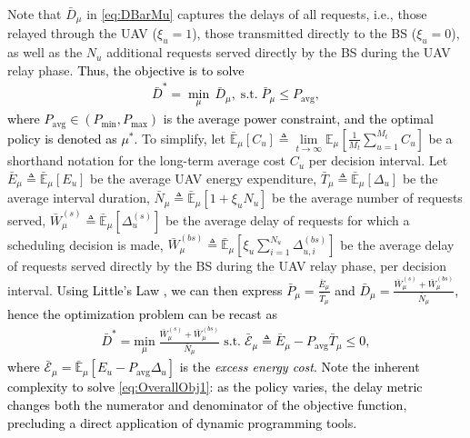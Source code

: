 \documentclass[10pt, twocolumn]{IEEEtran}
\theoremstyle{plain}
\theoremstyle{definition}
\theoremstyle{remark}
\newcommand\hlt[1]{\textcolor{black}{#1}}
\begin{document}
Note that $\bar{D}_{\mu}$ in \eqref{eq:DBarMu} captures the delays of all requests, i.e., those relayed through the UAV ($\xi_{u}{=}1$), those transmitted directly to the BS ($\xi_{u}{=}0$), as well as the $N_{u}$ additional requests served directly by the BS during the UAV relay phase. \hlt{Thus, the objective is to solve 
\begin{align}\label{eq:opt_prob_orig}
    \bar D^* = \min_{\mu} \, \bar{D}_{\mu}, \; \mathrm{s.t.} \; \bar P_{\mu} \leq P_{\mathrm{avg}},
\end{align}
where $P_{\mathrm{avg}}\in(P_{\min},P_{\max})$ is the average power constraint,
and the optimal policy is denoted as $\mu^*$.} To simplify, let $\bar{\mathbb{E}}_{\mu}[C_{u}]{\triangleq}\lim\limits_{t{\rightarrow}\infty}\mathbb{E}_{\mu}[\frac{1}{M_{t}}\sum_{u{=}1}^{M_{t}}C_{u}]$ be a shorthand notation for the long-term average cost $C_u$ per decision interval. Let $\bar{E}_{\mu}{\triangleq}\bar{\mathbb{E}}_{\mu}\left[E_{u}\right]$ be the average UAV energy expenditure, $\bar{T}_{\mu}{\triangleq}\bar{\mathbb{E}}_{\mu}\left[\Delta_{u}\right]$ be the average interval duration, $\bar{N}_{\mu}{\triangleq}\bar{\mathbb{E}}_{\mu}[1+\xi_{u}N_{u}]$ be the average number of requests served, $\bar{W}_{\mu}^{(s)}{\triangleq}\bar{\mathbb{E}}_{\mu}[\Delta_{u}^{(s)}]$ be the average delay of requests for which a scheduling decision is made, $\bar{W}_{\mu}^{(bs)}{\triangleq}\bar{\mathbb{E}}_{\mu}[\xi_{u}\sum_{i{=}1}^{N_{u}}\Delta_{u,i}^{(bs)}]$ be the average delay of requests served directly by the BS during the UAV relay phase, per decision interval. \hlt{Using Little's Law \cite{LittlesLaw}, we  can then express $\bar{P}_{\mu}{=}\frac{\bar{E}_{\mu}}{\bar{T}_{\mu}}$ and $\bar{D}_{\mu}{=}\frac{\bar{W}_{\mu}^{(s)}+\bar{W}_{\mu}^{(bs)}}{\bar{N}_{\mu}}$, hence the optimization problem can be recast as
\begin{align}\label{eq:OverallObj1}
    \bar{D}^{*} = \underset{\mu}{\mathrm{min}} \; \frac{\bar{W}_{\mu}^{(s)} + \bar{W}_{\mu}^{(bs)}}{\bar{N}_{\mu}} \; \mathrm{s.t.} \; 
    \bar{\mathcal E}_\mu\triangleq
    \bar{E}_{\mu} - P_{\mathrm{avg}}\bar{T}_{\mu} \leq 0,
\end{align}
where $\bar{\mathcal E}_\mu{=}\bar{\mathbb{E}}_{\mu}[E_{u}{-}P_{\mathrm{avg}}\Delta_u]$ is the \emph{excess energy cost}.
Note the inherent complexity to solve \eqref{eq:OverallObj1}: as the policy varies, the delay metric changes both the numerator and denominator of the objective function, precluding a direct application of dynamic programming tools.}
\end{document}

